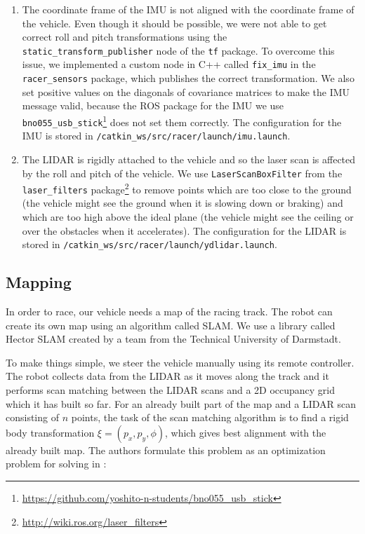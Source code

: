 \begin{enumerate}
	\item The coordinate frame of the \gls*{IMU} is not aligned with the coordinate frame of the vehicle. Even though it should be possible, we were not able to get correct roll and pitch transformations using the \texttt{static\_transform\_\-publisher} node of the \texttt{tf} package. To overcome this issue, we implemented a custom node in C++ called \texttt{fix\_imu} in the \texttt{racer\_sensors} package, which publishes the correct transformation. We also set positive values on the diagonals of covariance matrices to make the \gls*{IMU} message valid, because the \gls*{ROS} package for the \gls*{IMU} we use  \verb|bno055_usb_stick|\footnote{\url{https://github.com/yoshito-n-students/bno055\_usb\_stick}} does not set them correctly. The configuration for the \gls*{IMU} is stored in \texttt{/catkin\_ws/\allowbreak src/\allowbreak racer/\allowbreak launch/\allowbreak imu.launch}.

	\item The \gls*{LIDAR} is rigidly attached to the vehicle and so the laser scan is affected by the roll and pitch of the vehicle. We use \texttt{LaserScanBoxFilter} from the \texttt{laser\_filters} package\footnote{\url{http://wiki.ros.org/laser\_filters}} to remove points which are too close to the ground (the vehicle might see the ground when it is slowing down or braking) and which are too high above the ideal plane (the vehicle might see the ceiling or over the obstacles when it accelerates). The configuration for the \gls*{LIDAR} is stored in \texttt{/catkin\_ws/\allowbreak src/\allowbreak racer/\allowbreak launch/ydlidar.launch}.
\end{enumerate}

\subsection{Mapping}

In order to race, our vehicle needs a map of the racing track. The robot can create its own map using an algorithm called \gls{SLAM}. We use a library called Hector \gls*{SLAM} created by a team from the Technical University of Darmstadt.

To make things simple, we steer the vehicle manually using its remote controller. The robot collects data from the \gls*{LIDAR} as it moves along the track and it performs scan matching between the \gls*{LIDAR} scans and a 2D occupancy grid which it has built so far. For an already built part of the map and a \gls*{LIDAR} scan consisting of $n$ points, the task of the scan matching algorithm is to find a rigid body transformation $\xi =\left( p_x, p_y, \phi\right)$, which gives best alignment with the already built map. The authors formulate this problem as an optimization problem for solving in \cite{HectorSlam}:


